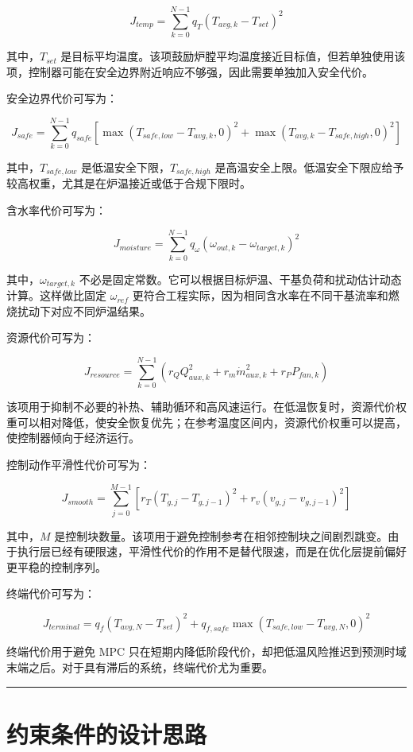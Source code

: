 \documentclass[UTF8,openany,zihao=-4,oneside]{ctexbook}
\newcommand{\manualdivider}{\par\vspace{0.6em}\noindent\textcolor{FGLine}{\rule{\linewidth}{0.7pt}}\vspace{0.6em}\par}
\begin{document}
\[
J_{temp}=\sum_{k=0}^{N-1}q_T\left(T_{avg,k}-T_{set}\right)^2
\]

其中，\(T_{set}\) 是目标平均温度。该项鼓励炉膛平均温度接近目标值，但若单独使用该项，控制器可能在安全边界附近响应不够强，因此需要单独加入安全代价。

安全边界代价可写为：

\[
J_{safe}=\sum_{k=0}^{N-1}q_{safe}\left[\max\left(T_{safe,low}-T_{avg,k},0\right)^2+\max\left(T_{avg,k}-T_{safe,high},0\right)^2\right]
\]

其中，\(T_{safe,low}\) 是低温安全下限，\(T_{safe,high}\) 是高温安全上限。低温安全下限应给予较高权重，尤其是在炉温接近或低于合规下限时。

含水率代价可写为：

\[
J_{moisture}=\sum_{k=0}^{N-1}q_\omega\left(\omega_{out,k}-\omega_{target,k}\right)^2
\]

其中，\(\omega_{target,k}\) 不必是固定常数。它可以根据目标炉温、干基负荷和扰动估计动态计算。这样做比固定 \(\omega_{ref}\) 更符合工程实际，因为相同含水率在不同干基流率和燃烧扰动下对应不同炉温结果。

资源代价可写为：

\[
J_{resource}=\sum_{k=0}^{N-1}\left(r_Q Q_{aux,k}^2+r_m\dot m_{aux,k}^2+r_P P_{fan,k}\right)
\]

该项用于抑制不必要的补热、辅助循环和高风速运行。在低温恢复时，资源代价权重可以相对降低，使安全恢复优先；在参考温度区间内，资源代价权重可以提高，使控制器倾向于经济运行。

控制动作平滑性代价可写为：

\[
J_{smooth}=\sum_{j=0}^{M-1}\left[r_T\left(T_{g,j}-T_{g,j-1}\right)^2+r_v\left(v_{g,j}-v_{g,j-1}\right)^2\right]
\]

其中，\(M\) 是控制块数量。该项用于避免控制参考在相邻控制块之间剧烈跳变。由于执行层已经有硬限速，平滑性代价的作用不是替代限速，而是在优化层提前偏好更平稳的控制序列。

终端代价可写为：

\[
J_{terminal}=q_f\left(T_{avg,N}-T_{set}\right)^2+q_{f,safe}\max\left(T_{safe,low}-T_{avg,N},0\right)^2
\]

终端代价用于避免 MPC 只在短期内降低阶段代价，却把低温风险推迟到预测时域末端之后。对于具有滞后的系统，终端代价尤为重要。

\manualdivider

\section{约束条件的设计思路}\label{sec:mpc-constraint-design}
\end{document}
